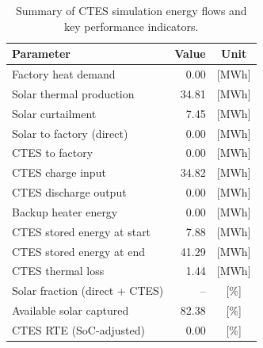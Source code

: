 \renewcommand{\arraystretch}{1.2}
\begin{table}[h]
\centering
\begin{tabular}{l|r c}
\hline
Parameter & Value & Unit \\
\hline
Factory heat demand & 0.00 & [MWh] \\
Solar thermal production & 34.81 & [MWh] \\
Solar curtailment & 7.45 & [MWh] \\
Solar to factory (direct) & 0.00 & [MWh] \\
CTES to factory & 0.00 & [MWh] \\
CTES charge input & 34.82 & [MWh] \\
CTES discharge output & 0.00 & [MWh] \\
Backup heater energy & 0.00 & [MWh] \\
CTES stored energy at start & 7.88 & [MWh] \\
CTES stored energy at end & 41.29 & [MWh] \\
CTES thermal loss & 1.44 & [MWh] \\
\hline
Solar fraction (direct + CTES) & -- & [\%] \\
Available solar captured & 82.38 & [\%] \\
CTES RTE (SoC-adjusted) & 0.00 & [\%] \\
\hline
\end{tabular}
\caption{Summary of CTES simulation energy flows and key performance indicators.}
\label{tab:ctes-simulation-summary}
\end{table}
